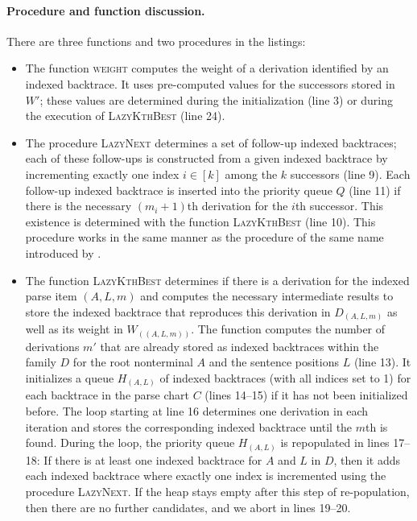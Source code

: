 \documentclass[../../document.tex]{subfiles}
\begin{document}
    \paragraph{Procedure and function discussion.}
    There are three functions and two procedures in the listings:
    \begin{itemize}
        \item The function \textsc{weight} computes the weight of a derivation identified by an indexed backtrace.
            It uses pre-computed values for the successors stored in \(W'\); these values are determined during the initialization (line 3) or during the execution of \textsc{LazyKthBest} (line 24).
        \item The procedure \textsc{LazyNext} determines a set of follow-up indexed backtraces; each of these follow-ups is constructed from a given indexed backtrace by incrementing exactly one index \(i \in [k]\) among the \(k\) successors (line 9).
            Each follow-up indexed backtrace is inserted into the priority queue \(Q\) (line 11) if there is the necessary \((m_i+1)\)th derivation for the \(i\)th successor.
            This existence is determined with the function \textsc{LazyKthBest} (line 10).
            This procedure works in the same manner as the procedure of the same name introduced by .
        \item The function \textsc{LazyKthBest} determines if there is a derivation for the indexed parse item \((A, L, m)\) and computes the necessary intermediate results to store the indexed backtrace that reproduces this derivation in \(D_{(A, L, m)}\) as well as its weight in \(W_{((A, L, m))}\).
            The function computes the number of derivations \(m'\) that are already stored as indexed backtraces within the family \(D\) for the root nonterminal \(A\) and the sentence positions \(L\) (line 13).
            It initializes a queue \(H_{(A, L)}\) of indexed backtraces (with all indices set to 1) for each backtrace in the parse chart \(C\) (lines 14--15) if it has not been initialized before.
            The loop starting at line 16 determines one derivation in each iteration and stores the corresponding indexed backtrace until the \(m\)th is found.
            During the loop, the priority queue \(H_{(A, L)}\) is repopulated in lines 17--18:
                If there is at least one indexed backtrace for \(A\) and \(L\) in \(D\), then it adds each indexed backtrace where exactly one index is incremented using the procedure \textsc{LazyNext}.
            If the heap stays empty after this step of re-population, then there are no further candidates, and we abort in lines 19--20.

\end{itemize}
\end{document}
